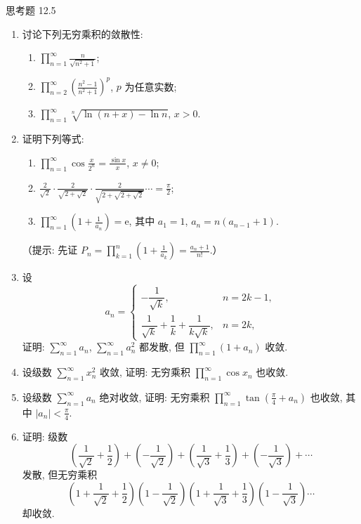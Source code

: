 \begin{exblock}{思考题 12.5}
\begin{enumerate}
  \item 讨论下列无穷乘积的敛散性:
  \begin{enumerate}
    \item $\displaystyle\prod_{n=1}^{\infty}\frac{n}{\sqrt{n^{2}+1}}$;
    \item $\displaystyle\prod_{n=2}^{\infty}\left(\frac{n^{2}-1}{n^{2}+1}\right)^{p}$, $p$ 为任意实数;
    \item $\displaystyle\prod_{n=1}^{\infty}\sqrt[n]{\ln(n+x)-\ln n}$, $x>0$.
  \end{enumerate}
  \item 证明下列等式:
  \begin{enumerate}
    \item $\displaystyle\prod_{n=1}^{\infty}\cos\frac{x}{2^{n}}=\frac{\sin x}{x}$, $x\neq0$;
    \item $\displaystyle\frac{2}{\sqrt{2}}\cdot\frac{2}{\sqrt{2+\sqrt{2}}}\cdot\frac{2}{\sqrt{2+\sqrt{2+\sqrt{2}}}}\cdots=\frac{\pi}{2}$;
    \item $\displaystyle\prod_{n=1}^{\infty}\left(1+\frac{1}{a_{n}}\right)=\mathrm{e}$, 其中 $a_{1}=1$, $a_{n}=n(a_{n-1}+1)$.
  \end{enumerate}
  （提示: 先证 $P_{n}=\prod_{k=1}^{n}\left(1+\frac{1}{a_{k}}\right)=\frac{a_{n}+1}{n!}$.）
  \item 设
  \[
    a_{n}=\left\{\begin{array}
{ll}
      -\dfrac{1}{\sqrt{k}}, & n=2k-1,\\[8pt]
      \dfrac{1}{\sqrt{k}}+\dfrac{1}{k}+\dfrac{1}{k\sqrt{k}}, & n=2k,
\end{array}\right.
\]
  证明: $\sum_{n=1}^{\infty}a_{n}$, $\sum_{n=1}^{\infty}a_{n}^{2}$ 都发散, 但 $\prod_{n=1}^{\infty}(1+a_{n})$ 收敛.
  \item 设级数 $\sum_{n=1}^{\infty}x_{n}^{2}$ 收敛, 证明: 无穷乘积 $\prod_{n=1}^{\infty}\cos x_{n}$ 也收敛.
  \item 设级数 $\sum_{n=1}^{\infty}a_{n}$ 绝对收敛, 证明: 无穷乘积 $\prod_{n=1}^{\infty}\tan\left(\frac{\pi}{4}+a_{n}\right)$ 也收敛, 其中 $|a_{n}|<\frac{\pi}{4}$.
  \item 证明: 级数
  \[
    \left(\frac{1}{\sqrt{2}}+\frac{1}{2}\right)+\left(-\frac{1}{\sqrt{2}}\right)+\left(\frac{1}{\sqrt{3}}+\frac{1}{3}\right)+\left(-\frac{1}{\sqrt{3}}\right)+\cdots
\]
  发散, 但无穷乘积
  \[
    \left(1+\frac{1}{\sqrt{2}}+\frac{1}{2}\right)\left(1-\frac{1}{\sqrt{2}}\right)\left(1+\frac{1}{\sqrt{3}}+\frac{1}{3}\right)\left(1-\frac{1}{\sqrt{3}}\right)\cdots
\]
  却收敛.
\end{enumerate}
\end{exblock}
